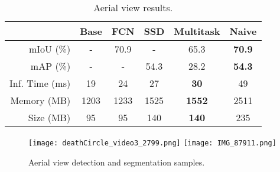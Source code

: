 \begin{table}[t]
\centering
\caption{Aerial view results.}
\vspace{-1mm}
\label{aerialviewresults}
\begin{tabular}{r|ccc|cc}
                   & Base & FCN & SSD & Multitask & Naive \\ \hline
mIoU (\%)   & - & 70.9    &  -        &   65.3 & \textbf{70.9}  \\ 
mAP (\%)  & -  & -   &  54.3  &  28.2 & \textbf{54.3} \\ \hline
Inf. Time (ms) & 19 & 24 & 27 & \textbf{30} & 49 \\
Memory (MB) & 1203 & 1233 & 1525 & \textbf{1552} & 2511 \\
Size (MB) & 95 & 95 & 140 & \textbf{140} & 235
\end{tabular}
\vspace{-1mm}
\end{table}

\begin{figure}[t]
  \centering
  \texttt{[image: deathCircle\_video3\_2799.png]}\hfill
  \texttt{[image: IMG\_87911.png]}
  \vspace{-3mm}
  \caption{Aerial view detection and segmentation samples.}
  \label{aerialsample}
  \vspace{-1mm}
\end{figure}